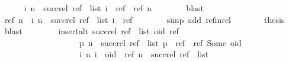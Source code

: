 \begin{isabellebody}
\ \ \ \ \isamarkupfalse%
\ {\isachardoublequoteopen}{\isacharbraceleft}{\isacharparenleft}i{\isacharcomma}\ n{\isacharparenright}\ {\isasymin}\ succ{\isacharunderscore}rel\ {\isacharparenleft}ref\ {\isacharhash}\ list{\isacharparenright}{\isachardot}\ i\ {\isacharequal}\ ref{\isacharbraceright}\ {\isasymsubseteq}\ {\isacharbraceleft}{\isacharparenleft}ref{\isacharcomma}\ n{\isacharparenright}{\isacharbraceright}{\isachardoublequoteclose}\isanewline
\ \ \ \ \ \ \isamarkupfalse%
\ blast\isanewline
\ \ \ \ \isamarkupfalse%
\ \isamarkupfalse%
\ {\isachardoublequoteopen}{\isacharbraceleft}{\isacharparenleft}ref{\isacharcomma}\ n{\isacharparenright}{\isacharbraceright}\ {\isasymsubseteq}\ {\isacharbraceleft}{\isacharparenleft}i{\isacharcomma}\ n{\isacharparenright}\ {\isasymin}\ succ{\isacharunderscore}rel\ {\isacharparenleft}ref\ {\isacharhash}\ list{\isacharparenright}{\isachardot}\ i\ {\isacharequal}\ ref{\isacharbraceright}{\isachardoublequoteclose}\isanewline
\ \ \ \ \ \ \isamarkupfalse%
\ {\isacharparenleft}simp\ add{\isacharcolon}\ ref{\isacharunderscore}in{\isacharunderscore}rel{\isacharparenright}\isanewline
\ \ \ \ \isamarkupfalse%
\ \isamarkupfalse%
\ {\isacharquery}thesis\ \isamarkupfalse%
\ blast\isanewline
\ \ \isamarkupfalse%
\isanewline
\ \ \isamarkupfalse%
\ \isamarkupfalse%
\ {\isachardoublequoteopen}insert{\isacharunderscore}alt\ {\isacharparenleft}succ{\isacharunderscore}rel\ {\isacharparenleft}ref\ {\isacharhash}\ list{\isacharparenright}{\isacharparenright}\ {\isacharparenleft}oid{\isacharcomma}\ ref{\isacharparenright}\ {\isacharequal}\isanewline
\ \ \ \ \ \ \ \ \ \ \ \ \ \ \ \ \ \ \ {\isacharbraceleft}{\isacharparenleft}p{\isacharcomma}\ n{\isacharparenright}\ {\isasymin}\ succ{\isacharunderscore}rel\ {\isacharparenleft}ref\ {\isacharhash}\ list{\isacharparenright}{\isachardot}\ p\ {\isasymnoteq}\ ref{\isacharbraceright}\ {\isasymunion}\ {\isacharbraceleft}{\isacharparenleft}ref{\isacharcomma}\ Some\ oid{\isacharparenright}{\isacharbraceright}\ {\isasymunion}\isanewline
\ \ \ \ \ \ \ \ \ \ \ \ \ \ \ \ \ \ \ {\isacharbraceleft}{\isacharparenleft}i{\isacharcomma}\ n{\isacharparenright}{\isachardot}\ i\ {\isacharequal}\ oid\ {\isasymand}\ {\isacharparenleft}ref{\isacharcomma}\ n{\isacharparenright}\ {\isasymin}\ succ{\isacharunderscore}rel\ {\isacharparenleft}ref\ {\isacharhash}\ list{\isacharparenright}{\isacharbraceright}{\isachardoublequoteclose}\isanewline

\end{isabellebody}
